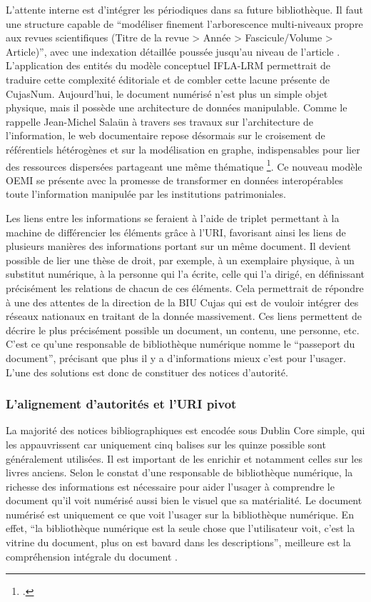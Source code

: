 L'attente interne est d'intégrer les périodiques dans sa future bibliothèque. Il faut une structure capable de \enquote{modéliser finement l'arborescence multi-niveaux propre aux revues scientifiques (Titre de la revue > Année > Fascicule/Volume > Article)}, avec une indexation détaillée poussée jusqu'au niveau de l'article . L'application des entités du modèle conceptuel \ac{IFLA-LRM} permettrait de traduire cette complexité éditoriale et de combler cette lacune présente de CujasNum. Aujourd'hui, le document numérisé n'est plus un simple objet physique, mais il possède une architecture de données manipulable. Comme le rappelle Jean-Michel Salaün à travers ses travaux sur l'architecture de l'information, le web documentaire repose désormais sur le croisement de référentiels hétérogènes et sur la modélisation en graphe, indispensables pour lier des ressources dispersées partageant une même thématique \footcite{salaunVuLuSu}. Ce nouveau modèle \ac{OEMI} se présente avec la promesse de transformer en données interopérables toute l'information manipulée par les institutions patrimoniales. 

Les liens entre les informations se feraient à l'aide de triplet permettant à la machine de différencier les éléments grâce à l'\ac{URI}, favorisant ainsi les liens de plusieurs manières des informations portant sur un même document. Il devient possible de lier une thèse de droit, par exemple, à un exemplaire physique, à un substitut numérique, à la personne qui l'a écrite, celle qui l'a dirigé, en définissant précisément les relations de chacun de ces éléments. Cela permettrait de répondre à une des attentes de la direction de la \ac{BIU Cujas} qui est de vouloir intégrer des réseaux nationaux en traitant de la donnée massivement. Ces liens permettent de décrire le plus précisément possible un document, un contenu, une personne, etc. C'est ce qu'une responsable de bibliothèque numérique nomme le \enquote{passeport du document}, précisant que plus il y a d'informations mieux c'est pour l'usager. L'une des solutions est donc de constituer des notices d'autorité.

\subsubsection{L'alignement d'autorités et l'URI pivot}
La majorité des notices bibliographiques est encodée sous Dublin Core simple, qui les appauvrissent car uniquement cinq balises sur les quinze possible sont généralement utilisées. Il est important de les enrichir et notamment celles sur les livres anciens. Selon le constat d'une responsable de bibliothèque numérique, la richesse des informations est nécessaire pour aider l'usager à comprendre le document qu'il voit numérisé aussi bien le visuel que sa matérialité. Le document numérisé est uniquement ce que voit l'usager sur la bibliothèque numérique. En effet, \enquote{la bibliothèque numérique est la seule chose que l'utilisateur voit, c'est la vitrine du document, plus on est bavard dans les descriptions}, meilleure est la compréhension intégrale du document . 

